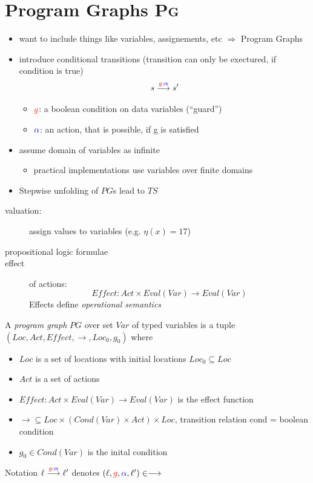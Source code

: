 \documentclass[a4paper, 10pt]{article}
\begin{document}
\section*{Program Graphs \textsc{Pg}}
\begin{itemize}
    \item want to include things like variables, assignements, etc $\Rightarrow$ Program Graphs
    \item introduce conditional transitions (transition can only be exectured, if condition is true) \[ s \overset{\textcolor{red}{g}:\textcolor{blue}{\alpha}}{\longrightarrow}s' \]
    \begin{itemize}
        \item $\textcolor{red}{g}$: a boolean condition on data variables (``guard'')
        \item $\textcolor{blue}{\alpha}$: an action, that is possible, if g is satisfied
    \end{itemize}
    \item assume domain of variables as infinite
    \begin{itemize}
        \item practical implementations use variables over finite domains
    \end{itemize}
    \item Stepwise unfolding of $PG$s lead to $TS$
\end{itemize}

\begin{description}
    \item[valuation:] assign values to variables (e.g. $\eta(x)=17$)
    \item[propositional logic formulae]
    \item[effect] of actions: \[ Effect: Act\times Eval(Var)\to Eval(Var) \]
    Effects define \emph{operational semantics}
\end{description}

\begin{shaded}
    A \emph{program graph} $PG$ over set $Var$ of typed variables is a tuple $\left( Loc, Act, Effect, \to, Loc_0, g_0 \right)$ where
    \begin{itemize}
        \item $Loc$ is a set of locations with initial locations $Loc_0\subseteq Loc$
        \item $Act$ is a set of actions
        \item $Effect: Act\times Eval(Var)\to Eval(Var)$ is the effect function
        \item $\to \subseteq Loc\times \left(Cond(Var) \times Act\right) \times Loc $, transition relation {\tiny cond = boolean condition}
        \item $g_0\in Cond(Var)$ is the inital condition
    \end{itemize}
    Notation $\ell\overset{\textcolor{red}{g}:\textcolor{blue}{\alpha}}{\longrightarrow} \ell'$ denotes $\left(\ell,\textcolor{red}{g}, \textcolor{blue}{\alpha},\ell'\right)\in \longrightarrow$
\end{shaded}
\end{document}
